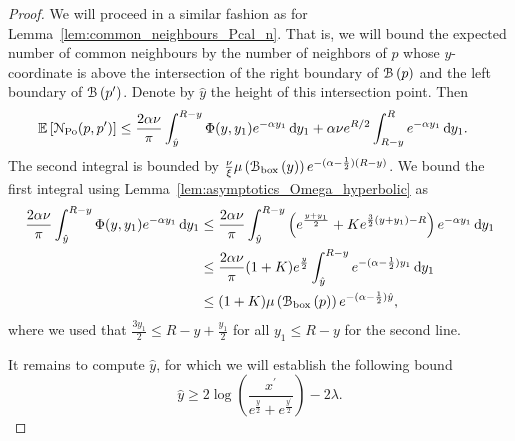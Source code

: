 \begin{proof}
We will proceed in a similar fashion as for Lemma~\ref{lem:common_neighbours_Pcal_n}. That is, we will bound the expected number of common neighbours by the number of neighbors of $p$ whose $y$-coordinate is above the intersection of the right boundary of ${\mathcal B}\left(p\right)$ and the left boundary of ${\mathcal B}\left(p^\prime\right)$. Denote by $\hat{y}$ the height of this intersection point. Then
\begin{align*}
	\mathbb{E}\left[{\mathcal N}_{{\mathrm{Po}}}(p,p^\prime)\right] &\le \frac{2\alpha \nu}{\pi} \int_{\hat{y}}^{R-y} \Phi(y,y_1) e^{-\alpha y_1} \operatorname{\mathrm{d}\hspace{-2pt}} y_1
		+ \alpha \nu e^{R/2} \int_{R-y}^{R} e^{-\alpha y_1} \operatorname{\mathrm{d}\hspace{-2pt}} y_1.
\end{align*} 
The second integral is bounded by $\frac{\nu}{\xi} \mu\left({\mathcal B}_{\text{box}}\left(y\right)\right) e^{-(\alpha - \frac{1}{2})(R-y)}$. We bound the first integral using Lemma~\ref{lem:asymptotics_Omega_hyperbolic} as
\begin{align*}
	\frac{2\alpha \nu}{\pi} \int_{\hat{y}}^{R-y} \Phi(y,y_1) e^{-\alpha y_1} \operatorname{\mathrm{d}\hspace{-2pt}} y_1
	&\le \frac{2\alpha \nu}{\pi} \int_{\hat{y}}^{R-y} \left(e^{\frac{y+y_1}{2}} + K e^{\frac{3}{2}(y + y_1)-R}\right) 
		e^{-\alpha y_1} \operatorname{\mathrm{d}\hspace{-2pt}} y_1 \\
	&\le \frac{2\alpha \nu}{\pi} (1+K)e^{\frac{y}{2}} \int_{\hat{y}}^{R-y} e^{-(\alpha - \frac{1}{2}) y_1} \operatorname{\mathrm{d}\hspace{-2pt}} y_1\\
	&\le (1 + K)\mu\left({\mathcal B}_{\text{box}}\left(p\right)\right)  e^{-(\alpha - \frac{1}{2})\hat{y}},
\end{align*}
where we used that $\frac{3y_1}{2} \le R - y + \frac{y_1}{2}$ for all $y_1 \le R-y$ for the second line. 

It remains to compute $\hat{y}$, for which we will establish the following bound
\begin{equation}\label{eq:joint_neighbors_KPKVB_intersection}
	\hat{y} \ge 2 \log\left(\frac{x^\prime}{e^{\frac{y}{2}} + e^{\frac{y^\prime}{2}}}\right) - 2\lambda.
\end{equation}


\end{proof}
